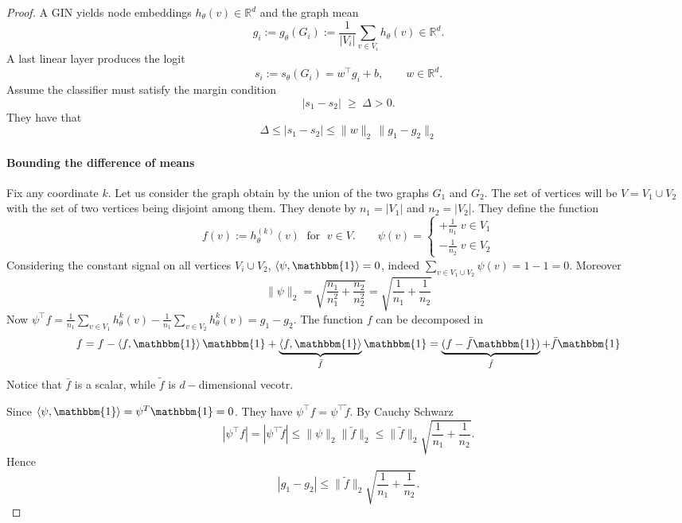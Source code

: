 \documentclass[11pt]{article}\usepackage{amsmath,amssymb,amsthm,bbm}
\newcommand{\RR}{\mathbb{R}}
\newcommand{\1}{\mathbbm{1}}
\newcommand{\ip}[2]{\left\langle #1,#2 \right\rangle}
\begin{document}
\begin{proof}
 A GIN yields node embeddings $h_\theta(v)\in\RR^{d}$ and the graph mean
\[
g_i:=g_\theta(G_i):=\frac1{|V_i|}\sum_{v\in V_i} h_\theta(v)\in\RR^{d}.\]
A last linear layer produces the logit
\[
s_i:=s_\theta(G_i)=w^{\top} g_i+b, \qquad w\in\RR^{d}.\]
 Assume the classifier must satisfy the margin condition
\[
|s_1-s_2|\;\ge\;\Delta>0.\]
They have that 
\[
\Delta \le |s_1-s_2| \le \|w\|_2\,\|g_1-g_2\|_2  \]
\paragraph{Bounding the difference of means} Fix any coordinate $k$.  Let us consider the graph obtain by the union of the two graphs $G_1$ and $G_2$. The set of vertices will be $V = V_1 \cup V_2$ with the set of two vertices being disjoint among them. They denote by $n_1 = |V_1|$ and $n_2 = |V_2|$. They define the function
\[
f(v):= h_\theta^{(k)}(v) \; \text{ for } \; v \in V. \qquad \psi(v) = \begin{cases}
    +\frac{1}{n_1} \; v \in V_1 \\
    -\frac{1}{n_2}  \; v \in V_2
\end{cases}\]
Considering the constant signal on all vertices $V_i \cup V_2$, $\ip{\psi}{\1}=0$, indeed $\sum_{ v \in {V_1 \cup V_2}} \psi(v) = 1-1 = 0$. 
Moreover \[ \| \psi \|_2  = \sqrt{\frac{n_1}{n_1^2} + \frac{n_2}{n_2^2}} = \sqrt{\frac{1}{n_1} + \frac{1}{n_2}} \]
Now \( \psi^{\top}f = \frac{1}{n_1} \sum_{v \in V_1} h_{\theta}^k(v) - \frac{1}{n_1} \sum_{v \in V_2} h_{\theta}^k(v)  = g_1 - g_2 \). 
The function $f$ can be decomposed in 
\[ f = f - \ip{f}{\1} \1 +  \underbrace{\ip{f}{\1}}_{\bar{f} } \1 = \underbrace{(f - \bar{f} \1)}_{\tilde{f}} +  \bar{f}  \1 \]
Notice that $\bar{f} $ is a scalar, while $\tilde{f}$ is $d-$dimensional vecotr. 
 
Since \(\ip{\psi}{\1} = \psi^T \1 = 0\). 
They have \( \psi^{\top}f = \psi^{\top} \tilde{f}  \). 
By Cauchy Schwarz
\[ |\psi^{\top} f  | = |\psi^{\top} \tilde{f} | \leq \|\psi \|_2  \|\tilde{f} \|_2 \leq   \|\tilde{f} \|_2 \sqrt{\frac{1}{n_1} + \frac{1}{n_2}}. \]
Hence 
\[ | g_1 - g_2 | \leq  \|\tilde{f} \|_2 \sqrt{\frac{1}{n_1} + \frac{1}{n_2}}. \]

\end{proof}
\end{document}
